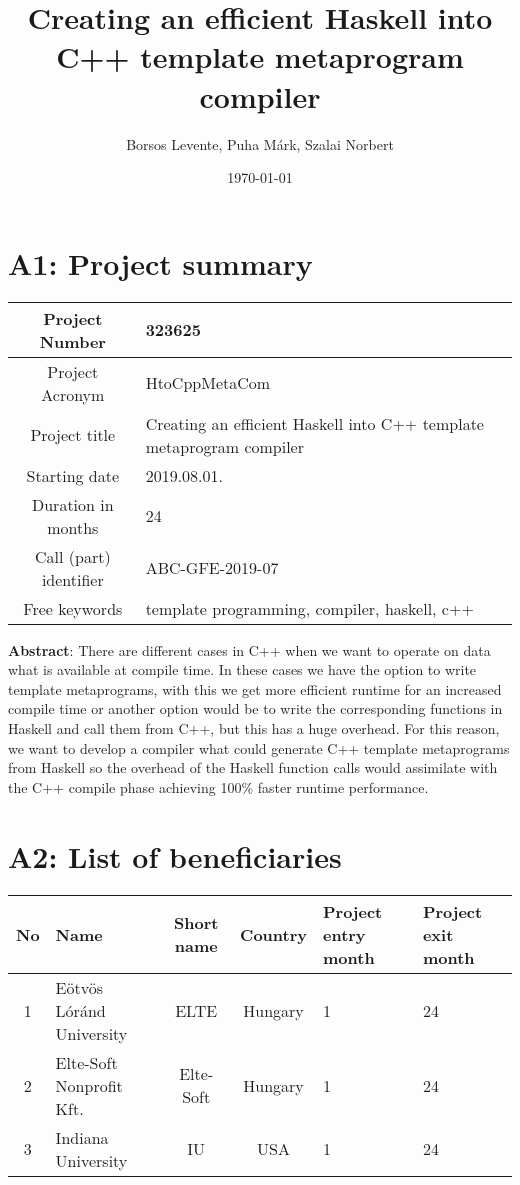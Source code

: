 \documentclass{article}
\title{Creating an efficient Haskell into C++ template metaprogram compiler}
\date{\today}
\author{Borsos Levente, Puha Márk, Szalai Norbert}
\begin{document}
  \maketitle
  \newpage

\tableofcontents

\newpage

\section{A1: Project summary}

\begin{table}[htbp]
\centering
	\begin{tabular}{ |c|p{4cm}|  }
		\hline
		Project Number & 323625\\ \hline
		Project Acronym & HtoCppMetaCom\\ \hline
		Project title &Creating an efficient Haskell into C++ template metaprogram compiler \\ \hline
		Starting date & 2019.08.01.  \\ \hline
		Duration in months   & 24   \\ \hline
		Call (part) identifier & ABC-GFE-2019-07  \\ \hline
		Free keywords & template programming, compiler, haskell, c++  \\ \hline
	\end{tabular}
\end{table}
\textbf{Abstract}:
There are different cases in C++ when we want to operate on data what is available at compile time. In these cases we have the option to write template metaprograms, with this we get more efficient runtime for an increased compile time or another option would be to write the corresponding functions in Haskell and call them from C++, but this has a huge overhead.  For this reason, we want to develop a compiler what could generate  C++ template metaprograms from Haskell so the overhead of the Haskell function calls would assimilate with the C++ compile phase achieving 100\% faster runtime performance.
\newpage

\section{A2: List of beneficiaries}
\pagestyle{fancy}

\begin{center}
	\begin{tabular}{ |c|p{2cm}|c|c|p{1cm}|p{1cm}| }
		\hline
		No & Name & Short name & Country & Project entry month & Project exit month \\ \hline
		1 & Eötvös Lóránd University & ELTE & Hungary & 1 & 24 \\ \hline
		2 & Elte-Soft Nonprofit Kft. & Elte-Soft & Hungary & 1 & 24 \\ \hline
		3 & Indiana University & IU & USA & 1 & 24 \\ \hline
	\end{tabular}
\end{center}
\end{document}
